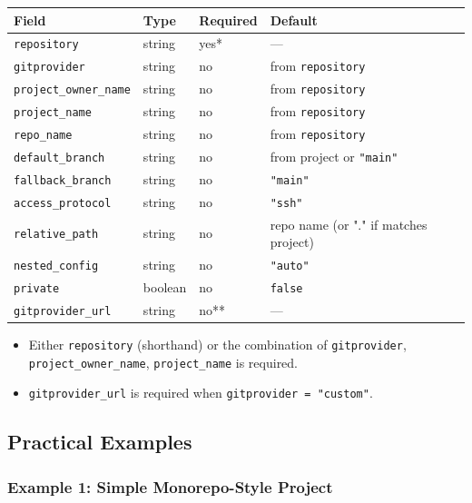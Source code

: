 \begin{center}
\begin{tabular}{llll}
\textbf{Field} & \textbf{Type} & \textbf{Required} & \textbf{Default} \\ \hline
\texttt{repository} & string & yes* & — \\
\texttt{gitprovider} & string & no & from \texttt{repository} \\
\texttt{project\_owner\_name} & string & no & from \texttt{repository} \\
\texttt{project\_name} & string & no & from \texttt{repository} \\
\texttt{repo\_name} & string & no & from \texttt{repository} \\
\texttt{default\_branch} & string & no & from project or \texttt{"main"} \\
\texttt{fallback\_branch} & string & no & \texttt{"main"} \\
\texttt{access\_protocol} & string & no & \texttt{"ssh"} \\
\texttt{relative\_path} & string & no & repo name (or "." if matches project) \\
\texttt{nested\_config} & string & no & \texttt{"auto"} \\
\texttt{private} & boolean & no & \texttt{false} \\
\texttt{gitprovider\_url} & string & no** & — \\ \hline
\end{tabular}
\end{center}

\begin{itemize}
  \item[*] Either \texttt{repository} (shorthand) or the combination of
        \texttt{gitprovider}, \texttt{project\_owner\_name}, \texttt{project\_name}
        is required.
  \item[**] \texttt{gitprovider\_url} is required when \texttt{gitprovider = "custom"}.
\end{itemize}

\subsection{Practical Examples}
\label{subsec:cgs-examples}

\subsubsection{Example 1: Simple Monorepo-Style Project}

